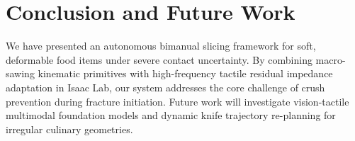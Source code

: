 \section{Conclusion and Future Work}
\label{sec:conclusion}
We have presented an autonomous bimanual slicing framework for soft, deformable food items under severe contact uncertainty. By combining macro-sawing kinematic primitives with high-frequency tactile residual impedance adaptation in Isaac Lab, our system addresses the core challenge of crush prevention during fracture initiation. Future work will investigate vision-tactile multimodal foundation models and dynamic knife trajectory re-planning for irregular culinary geometries.
